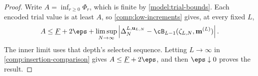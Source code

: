 
\begin{proof}
Write $A=\inf_{r\ge0}\Phi_r$, which is finite by
\eqref{model:trial-bounds}. Each encoded trial value is at least $A$, so
\eqref{comp:low-increments} gives, at every fixed $L$,
\[
 A\le\underline F+2\eps+
 \limsup_{N\to\infty}
 \left|\Delta_N^{L,\mathbf u_{L,N}}
       -\cB_{L-1}(\zeta_{L,N},\mathbf m^{(L)})\right|.
\]
The inner limit uses that depth's selected sequence. Letting $L\to\infty$
in \cref{comp:insertion-comparison} gives
$A\le\underline F+2\eps$, and then $\eps\downarrow0$ proves the result.
\end{proof}

